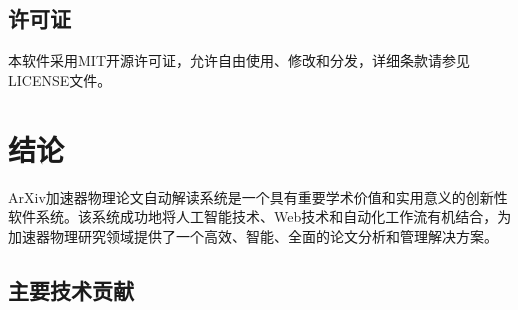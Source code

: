 \documentclass[12pt,a4paper]{article}
\begin{document}
\subsection{许可证}
本软件采用MIT开源许可证，允许自由使用、修改和分发，详细条款请参见LICENSE文件。

\section{结论}

ArXiv加速器物理论文自动解读系统是一个具有重要学术价值和实用意义的创新性软件系统。该系统成功地将人工智能技术、Web技术和自动化工作流有机结合，为加速器物理研究领域提供了一个高效、智能、全面的论文分析和管理解决方案。

\subsection{主要技术贡献}
\end{document}
